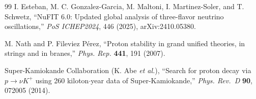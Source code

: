 \documentclass[aps,prd,twocolumn,amsmath,amssymb,superscriptaddress,nofootinbib,floatfix]{revtex4-2}
\begin{document}
\begin{thebibliography}{99}
 I. Esteban, M. C. Gonzalez-Garcia, M. Maltoni, I. Martinez-Soler, and T.
Schwetz, ``NuFIT 6.0: Updated global analysis of three-flavor neutrino
oscillations,'' \emph{PoS ICHEP2024}, 446 (2025), arXiv:2410.05380.

 M. Nath and P. Fileviez Pérez, ``Proton stability in grand unified
theories, in strings and in branes,'' \emph{Phys. Rep.} \textbf{441},
191 (2007).

 Super-Kamiokande Collaboration (K. Abe \emph{et al.}), ``Search for
proton decay via \(p\to\nu K^+\) using 260 kiloton\(\cdot\)year data of
Super-Kamiokande,'' \emph{Phys. Rev.~D} \textbf{90}, 072005 (2014).
\end{thebibliography}
\end{document}
